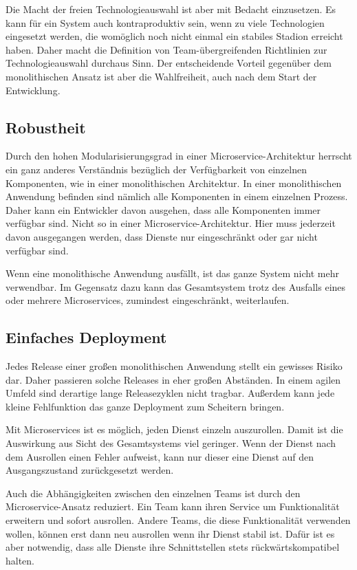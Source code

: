 Die Macht der freien Technologieauswahl ist aber mit Bedacht einzusetzen. Es kann für ein System auch kontraproduktiv sein, wenn zu viele Technologien eingesetzt werden, die womöglich noch nicht einmal ein stabiles Stadion erreicht haben. Daher macht die Definition von Team-übergreifenden Richtlinien zur Technologieauswahl durchaus Sinn. Der entscheidende Vorteil gegenüber dem monolithischen Ansatz ist aber die Wahlfreiheit, auch nach dem Start der Entwicklung.

\subsection{Robustheit}

Durch den hohen Modularisierungsgrad in einer Microservice-Architektur herrscht ein ganz anderes Verständnis bezüglich der Verfügbarkeit von einzelnen Komponenten, wie in einer monolithischen Architektur. In einer monolithischen Anwendung befinden sind nämlich alle Komponenten in einem einzelnen Prozess. Daher kann ein Entwickler davon ausgehen, dass alle Komponenten immer verfügbar sind. Nicht so in einer Microservice-Architektur. Hier muss jederzeit davon ausgegangen werden, dass Dienste nur eingeschränkt oder gar nicht verfügbar sind.

Wenn eine monolithische Anwendung ausfällt, ist das ganze System nicht mehr verwendbar. Im Gegensatz dazu kann das Gesamtsystem trotz des Ausfalls eines oder mehrere Microservices, zumindest eingeschränkt, weiterlaufen.

\subsection{Einfaches Deployment}

Jedes Release einer großen monolithischen Anwendung stellt ein gewisses Risiko dar. Daher passieren solche Releases in eher großen Abständen. In einem agilen Umfeld sind derartige lange Releasezyklen nicht tragbar. Außerdem kann jede kleine Fehlfunktion das ganze Deployment zum Scheitern bringen.

Mit Microservices ist es möglich, jeden Dienst einzeln auszurollen. Damit ist die Auswirkung aus Sicht des Gesamtsystems viel geringer. Wenn der Dienst nach dem Ausrollen einen Fehler aufweist, kann nur dieser eine Dienst auf den Ausgangszustand zurückgesetzt werden.

Auch die Abhängigkeiten zwischen den einzelnen Teams ist durch den Microservice-Ansatz reduziert. Ein Team kann ihren Service um Funktionalität erweitern und sofort ausrollen. Andere Teams, die diese Funktionalität verwenden wollen, können erst dann neu ausrollen wenn ihr Dienst stabil ist. Dafür ist es aber notwendig, dass alle Dienste ihre Schnittstellen stets rückwärtskompatibel halten.


